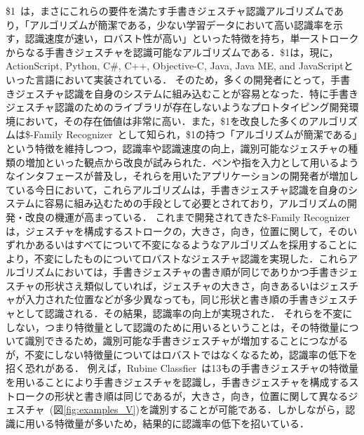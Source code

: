 \$1~\cite{Wobbrock:2007:GWL:1294211.1294238}は，まさにこれらの要件を満たす手書きジェスチャ認識アルゴリズムであり，「アルゴリズムが簡潔である，少ない学習データにおいて高い認識率を示す，認識速度が速い，ロバスト性が高い」といった特徴を持ち，単一ストロークからなる手書きジェスチャを認識可能なアルゴリズムである．\$1は，現に，ActionScript, Python, C\#, C++, Objective-C, Java, Java ME, and JavaScriptといった言語において実装されている．
そのため，多くの開発者にとって，手書きジェスチャ認識を自身のシステムに組み込むことが容易となった．特に手書きジェスチャ認識のためのライブラリが存在しないようなプロトタイピング開発環境において，その存在価値は非常に高い．また，\$1を改良した多くのアルゴリズムは\$-Family Recognizer~\cite{Anthony:2010:LMR:1839214.1839258,Reaver:2011:MQU:2021164.2021183,Li:2010:PFA:1753326.1753654,Anthony:2012:NFA:2305276.2305296,Herold:2012:CRF:2331067.2331074,Vatavu:2012:GPC:2388676.2388732,Taranta:2015:PPB:2788890.2788925,Pittman:2016:FFA:2856767.2856808,Vatavu:2012:OAF:2166966.2167022}として知られ，\$1の持つ「アルゴリズムが簡潔である」という特徴を維持しつつ，認識率や認識速度の向上，識別可能なジェスチャの種類の増加といった観点から改良が試みられた．ペンや指を入力として用いるようなインタフェースが普及し，それらを用いたアプリケーションの開発者が増加している今日において，これらアルゴリズムは，手書きジェスチャ認識を自身のシステムに容易に組み込むための手段として必要とされており，アルゴリズムの開発・改良の機運が高まっている．
これまで開発されてきた\$-Family Recognizerは，ジェスチャを構成するストロークの，大きさ，向き，位置に関して，そのいずれかあるいはすべてについて不変になるようなアルゴリズムを採用することにより，不変にしたものについてロバストなジェスチャ認識を実現した．これらアルゴリズムにおいては，手書きジェスチャの書き順が同じでありかつ手書きジェスチャの形状さえ類似していれば，ジェスチャの大きさ，向きあるいはジェスチャが入力された位置などが多少異なっても，同じ形状と書き順の手書きジェスチャとして認識される．その結果，認識率の向上が実現された．
それらを不変にしない，つまり特徴量として認識のために用いるということは，その特徴量について識別できるため，識別可能な手書きジェスチャが増加することにつながるが，不変にしない特徴量についてはロバストではなくなるため，認識率の低下を招く恐れがある．
例えば，Rubine Classfier~\cite{Rubine:1991:SGE:122718.122753}は13もの手書きジェスチャの特徴量を用いることにより手書きジェスチャを認識し，手書きジェスチャを構成するストロークの形状と書き順は同じであるが，大きさ，向き，位置に関して異なるジェスチャ~(図\ref{fig:examples_V})を識別することが可能である．しかしながら，認識に用いる特徴量が多いため，結果的に認識率の低下を招いている．

